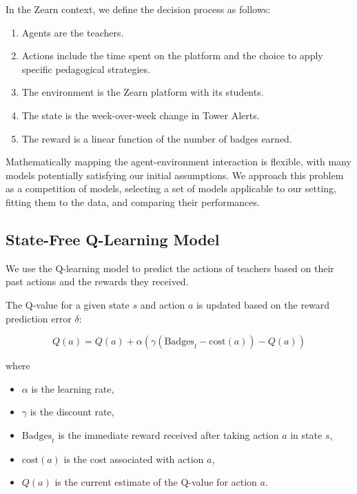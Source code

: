 \documentclass[
  number,
  preprint,
  3p,
  onecolumn]{elsarticle}
\providecommand{\tightlist}{%
  \setlength{\itemsep}{0pt}\setlength{\parskip}{0pt}}\usepackage{longtable,booktabs,array}
\begin{document}
In the Zearn context, we define the decision process as follows:

\begin{enumerate}
\def\labelenumi{\arabic{enumi}.}
\item
  Agents are the teachers.
\item
  Actions include the time spent on the platform and the choice to apply
  specific pedagogical strategies.
\item
  The environment is the Zearn platform with its students.
\item
  The state is the week-over-week change in Tower Alerts.
\item
  The reward is a linear function of the number of badges earned.
\end{enumerate}

Mathematically mapping the agent-environment interaction is flexible,
with many models potentially satisfying our initial assumptions. We
approach this problem as a competition of models, selecting a set of
models applicable to our setting, fitting them to the data, and
comparing their performances.

\hypertarget{state-free-q-learning-model}{%
\subsection{State-Free Q-Learning
Model}\label{state-free-q-learning-model}}

We use the Q-learning model to predict the actions of teachers based on
their past actions and the rewards they received.

The Q-value for a given state \(s\) and action \(a\) is updated based on
the reward prediction error \(\delta\):

\[
Q(a) = Q(a) + \alpha \left( \gamma (\text{Badges}_t - \text{cost}(a)) - Q(a) \right)
\]

where

\begin{itemize}
\tightlist
\item
  \(\alpha\) is the learning rate,
\item
  \(\gamma\) is the discount rate,
\item
  \(\text{Badges}_t\) is the immediate reward received after taking
  action \(a\) in state \(s\),
\item
  \(\text{cost}(a)\) is the cost associated with action \(a\),
\item
  \(Q(a)\) is the current estimate of the Q-value for action \(a\).
\end{itemize}
\end{document}
